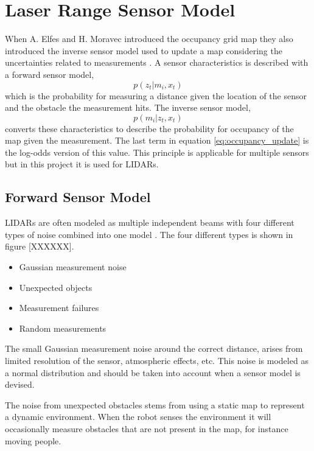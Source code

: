 \section{Laser Range Sensor Model}
\label{sec:laser_range_sensor}
When A. Elfes and H. Moravec introduced the occupancy grid map they also introduced the inverse sensor model used to update a map considering the uncertainties related to measurements \cite{elfesMoravecOccGrid}. 
A sensor characteristics is described with a forward sensor model, 
\begin{equation*}
	p(z_t|m_i,x_t)
\end{equation*}
which is the probability for measuring a distance given the location of the sensor and the obstacle the measurement hits. 
The inverse sensor model,
\begin{equation*}
	p(m_i|z_t,x_t)
\end{equation*}
converts these characteristics to describe the probability for occupancy of the map given the measurement. The last term in equation \vref{eq:occupancy_update} is the log-odds version of this value.
This principle is applicable for multiple sensors but in this project it is used for LIDARs. 


\subsection{Forward Sensor Model}
LIDARs are often modeled as multiple independent beams with four different types of noise combined into one model \cite{probRob}.
The four different types is shown in figure [XXXXXX].

\begin{itemize}
	\item Gaussian measurement noise
	\item Unexpected objects
	\item Measurement failures
	\item Random measurements
\end{itemize}


The small Gaussian measurement noise around the correct distance, arises from limited resolution of the sensor, atmospheric effects, etc. This noise is modeled as a normal distribution and should be taken into account when a sensor model is devised. 

The noise from unexpected obstacles stems from using a static map to represent a dynamic environment. When the robot senses the environment it will occasionally measure obstacles that are not present in the map, for instance moving people.

